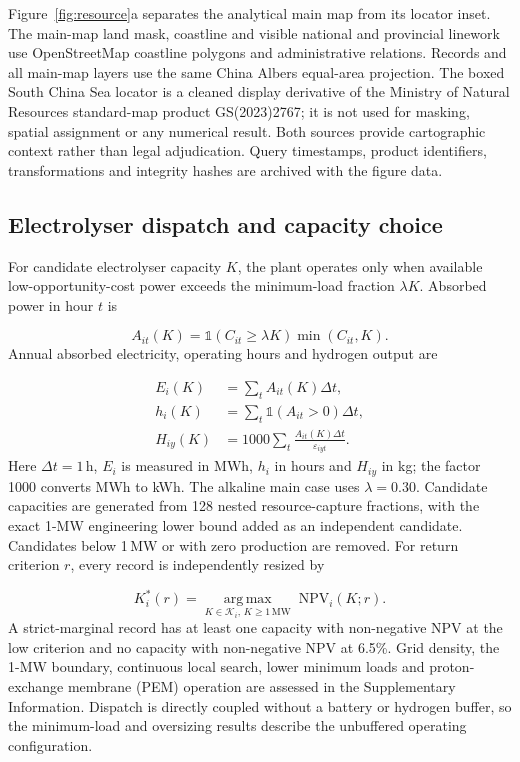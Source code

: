 \documentclass[11pt,a4paper]{article}
\begin{document}
Figure~\ref{fig:resource}a separates the analytical main map from its locator inset. The main-map land mask, coastline and visible national and provincial linework use OpenStreetMap coastline polygons and administrative relations\cite{osmcoast}. Records and all main-map layers use the same China Albers equal-area projection. The boxed South China Sea locator is a cleaned display derivative of the Ministry of Natural Resources standard-map product GS(2023)2767\cite{mnrmap2023}; it is not used for masking, spatial assignment or any numerical result. Both sources provide cartographic context rather than legal adjudication. Query timestamps, product identifiers, transformations and integrity hashes are archived with the figure data.

\subsection*{Electrolyser dispatch and capacity choice}

For candidate electrolyser capacity $K$, the plant operates only when available low-opportunity-cost power exceeds the minimum-load fraction $\lambda K$. Absorbed power in hour $t$ is

\begin{equation}
A_{it}(K)=\mathbb{1}\!\left(C_{it}\geq\lambda K\right)\min(C_{it},K).
\label{eq:dispatch}
\end{equation}
Annual absorbed electricity, operating hours and hydrogen output are

\begin{equation}
\begin{aligned}
E_i(K)&=\sum_t A_{it}(K)\Delta t,\\
h_i(K)&=\sum_t\mathbb{1}\!\left(A_{it}>0\right)\Delta t,\\
H_{iy}(K)&=1000\sum_t\frac{A_{it}(K)\Delta t}{\varepsilon_{iyt}}.
\end{aligned}
\label{eq:operation}
\end{equation}
Here $\Delta t=1$\,h, $E_i$ is measured in MWh, $h_i$ in hours and $H_{iy}$ in kg; the factor 1000 converts MWh to kWh. The alkaline main case uses $\lambda=0.30$. Candidate capacities are generated from 128 nested resource-capture fractions, with the exact 1-MW engineering lower bound added as an independent candidate. Candidates below 1\,MW or with zero production are removed. For return criterion $r$, every record is independently resized by

\begin{equation}
K_i^*(r)=\underset{K\in\mathcal{K}_i,\,K\geq1\,\mathrm{MW}}{\operatorname{arg\,max}}
\;\mathrm{NPV}_i(K;r).
\label{eq:capacity}
\end{equation}
A strict-marginal record has at least one capacity with non-negative NPV at the low criterion and no capacity with non-negative NPV at 6.5\%. Grid density, the 1-MW boundary, continuous local search, lower minimum loads and proton-exchange membrane (PEM) operation are assessed in the Supplementary Information. Dispatch is directly coupled without a battery or hydrogen buffer, so the minimum-load and oversizing results describe the unbuffered operating configuration.
\end{document}
